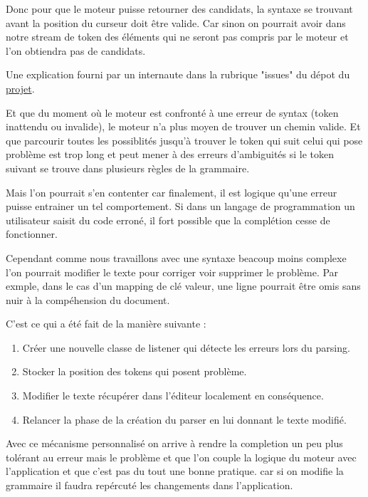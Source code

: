 \documentclass[
    iict, %
    il, %
]{heig-tb}
\begin{document}
Donc pour que le moteur puisse retourner des candidats, la syntaxe se trouvant avant la position du curseur doit être valide.
Car sinon on pourrait avoir dans notre stream de token des éléments qui ne seront pas compris par le moteur et l'on obtiendra pas de candidats.

Une explication fourni par un internaute dans la rubrique "issues" du dépot du \href{ https://github.com/mike-lischke/antlr4-c3/issues/29}{projet}.

Et que du moment où le moteur est confronté à une erreur de syntax (token inattendu ou invalide), le moteur n'a plus moyen de trouver un chemin valide.
Et que parcourir toutes les possiblités jusqu'à trouver le token qui suit celui qui pose problème est trop long et peut mener à des erreurs d'ambiguités si le token suivant se trouve dans plusieurs règles de la grammaire.

Mais l'on pourrait s'en contenter car finalement, il est logique qu'une erreur puisse entrainer un tel comportement.
Si dans un langage de programmation un utilisateur saisit du code erroné, il fort possible que la complétion cesse de fonctionner.


Cependant comme nous travaillons avec une syntaxe beacoup moins complexe l'on pourrait modifier le texte pour corriger voir supprimer le problème.
Par exmple, dans le cas d'un mapping de clé valeur, une ligne pourrait être omis sans nuir à la compéhension du document.

C'est ce qui a été fait de la manière suivante :
\begin{enumerate}
    \item Créer une nouvelle classe de listener qui détecte les erreurs lors du parsing.
    \item Stocker la position des tokens qui posent problème.
    \item Modifier le texte récupérer dans l'éditeur localement en conséquence.
    \item Relancer la phase de la création du parser en lui donnant le texte modifié.
\end{enumerate}

Avec ce mécanisme personnalisé on arrive à rendre la completion un peu plus tolérant au erreur mais le problème et que l'on couple la logique du moteur avec l'application et que c'est pas du tout une bonne pratique.
car si on modifie la grammaire il faudra repércuté les changements dans l'application.

\end{document}
